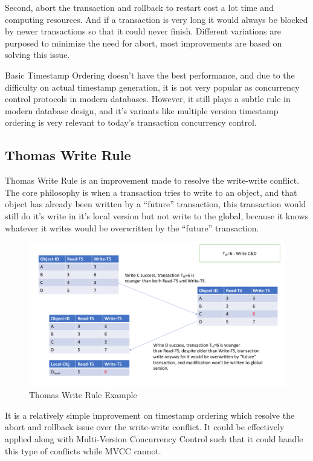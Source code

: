 Second, abort the transaction and rollback to restart cost a lot time and computing resources. And if a transaction is very long it would always be blocked by newer transactions so that it could never finish. Different variations are purposed to minimize the need for abort, most improvements are based on solving this issue.

Basic Timestamp Ordering doesn't have the best performance\cite{harding2017evaluation}, and due to the difficulty on actual timestamp generation, it is not very popular as concurrency control protocols in modern databases. However, it still plays a subtle rule in modern database design, and it's variants like multiple version timestamp ordering is very relevant to today's transaction concurrency control.
\subsection{Thomas Write Rule}

Thomas Write Rule is an improvement made to resolve the write-write conflict. The core philosophy is when a transaction tries to write to an object, and that object has already been written by a ``future'' transaction, this transaction would still do it's write in it's local version but not write to the global, because it knows whatever it writes would be overwritten by the ``future'' transaction.

\begin{figure}[H]
	\centering
	\includegraphics[width=0.8\linewidth]{twrTO.pdf}
	\caption{Thomas Write Rule Example}	
\end{figure}

It is a relatively simple improvement on timestamp ordering which resolve the abort and rollback issue over the write-write conflict. It could be effectively applied along with Multi-Version Concurrency Control such that it could handle this type of conflicts while MVCC cannot.

